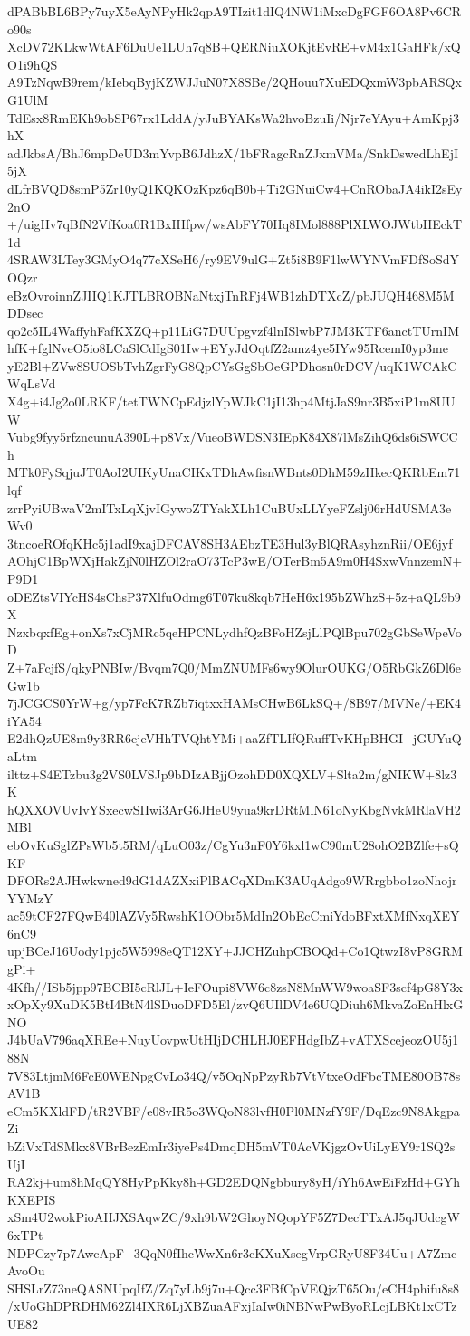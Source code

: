 dPABbBL6BPy7uyX5eAyNPyHk2qpA9TIzit1dIQ4NW1iMxcDgFGF6OA8Pv6CRo90s
XcDV72KLkwWtAF6DuUe1LUh7q8B+QERNiuXOKjtEvRE+vM4x1GaHFk/xQO1i9hQS
A9TzNqwB9rem/kIebqByjKZWJJuN07X8SBe/2QHouu7XuEDQxmW3pbARSQxG1UlM
TdEsx8RmEKh9obSP67rx1LddA/yJuBYAKsWa2hvoBzuIi/Njr7eYAyu+AmKpj3hX
adJkbsA/BhJ6mpDeUD3mYvpB6JdhzX/1bFRagcRnZJxmVMa/SnkDswedLhEjI5jX
dLfrBVQD8smP5Zr10yQ1KQKOzKpz6qB0b+Ti2GNuiCw4+CnRObaJA4ikI2sEy2nO
+/uigHv7qBfN2VfKoa0R1BxIHfpw/wsAbFY70Hq8IMol888PlXLWOJWtbHEckT1d
4SRAW3LTey3GMyO4q77cXSeH6/ry9EV9ulG+Zt5i8B9F1lwWYNVmFDfSoSdYOQzr
eBzOvroinnZJIIQ1KJTLBROBNaNtxjTnRFj4WB1zhDTXcZ/pbJUQH468M5MDDsec
qo2c5IL4WaffyhFafKXZQ+p11LiG7DUUpgvzf4lnISlwbP7JM3KTF6anctTUrnIM
hfK+fglNveO5io8LCaSlCdIgS01Iw+EYyJdOqtfZ2amz4ye5IYw95RcemI0yp3me
yE2Bl+ZVw8SUOSbTvhZgrFyG8QpCYsGgSbOeGPDhosn0rDCV/uqK1WCAkCWqLsVd
X4g+i4Jg2o0LRKF/tetTWNCpEdjzlYpWJkC1jI13hp4MtjJaS9nr3B5xiP1m8UUW
Vubg9fyy5rfzncunuA390L+p8Vx/VueoBWDSN3IEpK84X87lMsZihQ6ds6iSWCCh
MTk0FySqjuJT0AoI2UIKyUnaCIKxTDhAwfisnWBnts0DhM59zHkecQKRbEm71lqf
zrrPyiUBwaV2mITxLqXjvIGywoZTYakXLh1CuBUxLLYyeFZslj06rHdUSMA3eWv0
3tncoeROfqKHc5j1adI9xajDFCAV8SH3AEbzTE3Hul3yBlQRAsyhznRii/OE6jyf
AOhjC1BpWXjHakZjN0lHZOl2raO73TcP3wE/OTerBm5A9m0H4SxwVnnzemN+P9D1
oDEZtsVIYcHS4sChsP37XlfuOdmg6T07ku8kqb7HeH6x195bZWhzS+5z+aQL9b9X
NzxbqxfEg+onXs7xCjMRc5qeHPCNLydhfQzBFoHZsjLlPQlBpu702gGbSeWpeVoD
Z+7aFcjfS/qkyPNBIw/Bvqm7Q0/MmZNUMFs6wy9OlurOUKG/O5RbGkZ6Dl6eGw1b
7jJCGCS0YrW+g/yp7FcK7RZb7iqtxxHAMsCHwB6LkSQ+/8B97/MVNe/+EK4iYA54
E2dhQzUE8m9y3RR6ejeVHhTVQhtYMi+aaZfTLIfQRuffTvKHpBHGI+jGUYuQaLtm
ilttz+S4ETzbu3g2VS0LVSJp9bDIzABjjOzohDD0XQXLV+Slta2m/gNIKW+8lz3K
hQXXOVUvIvYSxecwSIIwi3ArG6JHeU9yua9krDRtMlN61oNyKbgNvkMRlaVH2MBl
ebOvKuSglZPsWb5t5RM/qLuO03z/CgYu3nF0Y6kxl1wC90mU28ohO2BZlfe+sQKF
DFORs2AJHwkwned9dG1dAZXxiPlBACqXDmK3AUqAdgo9WRrgbbo1zoNhojrYYMzY
ac59tCF27FQwB40lAZVy5RwshK1OObr5MdIn2ObEcCmiYdoBFxtXMfNxqXEY6nC9
upjBCeJ16Uody1pjc5W5998eQT12XY+JJCHZuhpCBOQd+Co1QtwzI8vP8GRMgPi+
4Kfh//ISb5jpp97BCBI5cRlJL+IeFOupi8VW6c8zsN8MnWW9woaSF3scf4pG8Y3x
xOpXy9XuDK5BtI4BtN4lSDuoDFD5El/zvQ6UIlDV4e6UQDiuh6MkvaZoEnHlxGNO
J4bUaV796aqXREe+NuyUovpwUtHIjDCHLHJ0EFHdgIbZ+vATXScejeozOU5j188N
7V83LtjmM6FcE0WENpgCvLo34Q/v5OqNpPzyRb7VtVtxeOdFbcTME80OB78sAV1B
eCm5KXldFD/tR2VBF/e08vIR5o3WQoN83lvfH0Pl0MNzfY9F/DqEzc9N8AkgpaZi
bZiVxTdSMkx8VBrBezEmIr3iyePs4DmqDH5mVT0AcVKjgzOvUiLyEY9r1SQ2sUjI
RA2kj+um8hMqQY8HyPpKky8h+GD2EDQNgbbury8yH/iYh6AwEiFzHd+GYhKXEPIS
xSm4U2wokPioAHJXSAqwZC/9xh9bW2GhoyNQopYF5Z7DecTTxAJ5qJUdcgW6xTPt
NDPCzy7p7AwcApF+3QqN0fIhcWwXn6r3cKXuXsegVrpGRyU8F34Uu+A7ZmcAvoOu
SHSLrZ73neQASNUpqIfZ/Zq7yLb9j7u+Qcc3FBfCpVEQjzT65Ou/eCH4phifu8s8
/xUoGhDPRDHM62Zl4IXR6LjXBZuaAFxjIaIw0iNBNwPwByoRLcjLBKt1xCTzUE82
